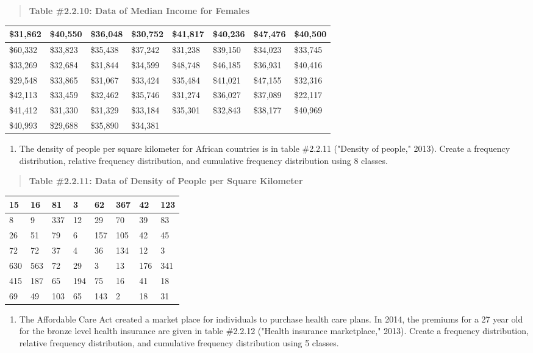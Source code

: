 \documentclass[]{book}
\providecommand{\tightlist}{%
  \setlength{\itemsep}{0pt}\setlength{\parskip}{0pt}}
\begin{document}
\begin{quote}
\textbf{Table \#2.2.10: Data of Median Income for Females}
\end{quote}

\begin{longtable}[]{@{}llllllll@{}}
\toprule
\$31,862 & \$40,550 & \$36,048 & \$30,752 & \$41,817 & \$40,236 & \$47,476 & \$40,500\tabularnewline
\midrule
\endhead
\$60,332 & \$33,823 & \$35,438 & \$37,242 & \$31,238 & \$39,150 & \$34,023 & \$33,745\tabularnewline
\$33,269 & \$32,684 & \$31,844 & \$34,599 & \$48,748 & \$46,185 & \$36,931 & \$40,416\tabularnewline
\$29,548 & \$33,865 & \$31,067 & \$33,424 & \$35,484 & \$41,021 & \$47,155 & \$32,316\tabularnewline
\$42,113 & \$33,459 & \$32,462 & \$35,746 & \$31,274 & \$36,027 & \$37,089 & \$22,117\tabularnewline
\$41,412 & \$31,330 & \$31,329 & \$33,184 & \$35,301 & \$32,843 & \$38,177 & \$40,969\tabularnewline
\$40,993 & \$29,688 & \$35,890 & \$34,381 & & & &\tabularnewline
\bottomrule
\end{longtable}

\begin{enumerate}
\def\labelenumi{\arabic{enumi}.}
\setcounter{enumi}{2}
\tightlist
\item
  The density of people per square kilometer for African countries is
  in table \#2.2.11 ("Density of people," 2013). Create a frequency
  distribution, relative frequency distribution, and cumulative
  frequency distribution using 8 classes.
\end{enumerate}

\begin{quote}
\textbf{Table \#2.2.11: Data of Density of People per Square Kilometer}
\end{quote}

\begin{longtable}[]{@{}llllllll@{}}
\toprule
15 & 16 & 81 & 3 & 62 & 367 & 42 & 123\tabularnewline
\midrule
\endhead
8 & 9 & 337 & 12 & 29 & 70 & 39 & 83\tabularnewline
26 & 51 & 79 & 6 & 157 & 105 & 42 & 45\tabularnewline
72 & 72 & 37 & 4 & 36 & 134 & 12 & 3\tabularnewline
630 & 563 & 72 & 29 & 3 & 13 & 176 & 341\tabularnewline
415 & 187 & 65 & 194 & 75 & 16 & 41 & 18\tabularnewline
69 & 49 & 103 & 65 & 143 & 2 & 18 & 31\tabularnewline
\bottomrule
\end{longtable}

\begin{enumerate}
\def\labelenumi{\arabic{enumi}.}
\setcounter{enumi}{3}
\tightlist
\item
  The Affordable Care Act created a market place for individuals to
  purchase health care plans. In 2014, the premiums for a 27 year old
  for the bronze level health insurance are given in table \#2.2.12
  ("Health insurance marketplace," 2013). Create a frequency
  distribution, relative frequency distribution, and cumulative
  frequency distribution using 5 classes.
\end{enumerate}
\end{document}
